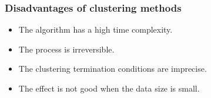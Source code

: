 \documentclass[12pt]{article}  %
\begin{document}
\subsubsection{Disadvantages of clustering methods}
\begin{itemize}
    \item The algorithm has a high time complexity.
    \item The process is irreversible.
    \item The clustering termination conditions are imprecise.
    \item The effect is not good when the data size is small.

\end{itemize}


\end{document}

